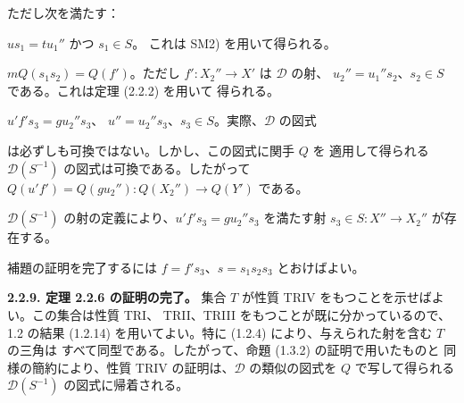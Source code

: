 \clearpage
{}%
\begingroup
\small
\setlength{\parskip}{0pt}%
\setlength{\emergencystretch}{1.5em}%
\setlength{\abovedisplayskip}{1pt plus 1pt minus 1pt}%
\setlength{\belowdisplayskip}{1pt plus 1pt minus 1pt}%

\noindent ただし次を満たす：

\par\noindent{}$us_1=tu_1''$ かつ $s_1\in S$。
これは SM2) を用いて得られる。

\par\noindent{}$mQ(s_1s_2)=Q(f')$。ただし
$f'\colon X_2''\longrightarrow X'$ は $\mathcal D$ の射、
$u_2''=u_1''s_2$、$s_2\in S$ である。これは定理 (2.2.2) を用いて
得られる。

\par\noindent{}$u'f's_3=gu_2''s_3$、
$u''=u_2''s_3$、$s_3\in S$。実際、$\mathcal D$ の図式

\begin{center}
\end{center}

\noindent は必ずしも可換ではない。しかし、この図式に関手 $Q$ を
適用して得られる $\mathcal D(S^{-1})$ の図式は可換である。したがって
$Q(u'f')=Q(gu_2'')\colon Q(X_2'')\longrightarrow Q(Y')$ である。

$\mathcal D(S^{-1})$ の射の定義により、$u'f's_3=gu_2''s_3$ を満たす射
$s_3\in S\colon X''\longrightarrow X_2''$ が存在する。

補題の証明を完了するには $f=f's_3$、$s=s_1s_2s_3$ とおけばよい。

\smallskip
\noindent\textbf{2.2.9. 定理 2.2.6 の証明の完了。}
%
集合 $T$ が性質 TRIV をもつことを示せばよい。この集合は性質 TRI、
TRII、TRIII をもつことが既に分かっているので、1.2 の結果 (1.2.14)
を用いてよい。特に (1.2.4) により、与えられた射を含む $T$ の三角は
すべて同型である。したがって、命題 (1.3.2) の証明で用いたものと
同様の簡約により、性質 TRIV の証明は、$\mathcal D$ の類似の図式を
$Q$ で写して得られる $\mathcal D(S^{-1})$ の図式に帰着される。


